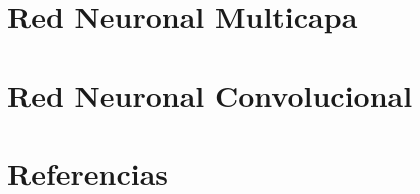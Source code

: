\documentclass{article}
\begin{document}
\section{Red Neuronal Multicapa}

\section{Red Neuronal Convolucional}

\section{Referencias}
\end{document}
